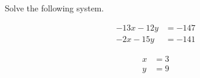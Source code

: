 
\begin{question}
Solve the following system.

\[\begin{aligned}
- 13 x - 12 y&=-147\\
- 2 x - 15 y&=-141
\end{aligned}\]
\end{question}

\begin{solution}
\[\begin{aligned}
x&=3\\
y&=9
\end{aligned}\]
\end{solution}

